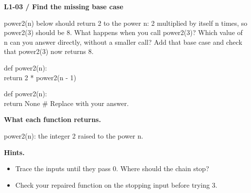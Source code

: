 \documentclass[11pt,a4paper]{article}
\begin{document}
\par\noindent\begin{minipage}{\linewidth}
\textbf{L1-03 / Find the missing base case}\par\smallskip power2(n) below should return 2 to the power n: 2 multiplied by itself n times, so power2(3) should be 8. What happens when you call power2(3)? Which value of n can you answer directly, without a smaller call? Add that base case and check that power2(3) now returns 8.\par
\par\smallskip\noindent\colorbox{codepaper}{\parbox{\dimexpr\linewidth-2\fboxsep\relax}{\small\ttfamily\raggedright def power2(n):\\\hspace*{2.4em}return 2 * power2(n - 1)}}\par
\par{}\par\smallskip\noindent\colorbox{codepaper}{\parbox{\dimexpr\linewidth-2\fboxsep\relax}{\small\ttfamily\raggedright def power2(n):\\\hspace*{2.4em}return None  \# Replace with your answer.}}\par
{\small\textbf{What each function returns.}\par power2(n): the integer 2 raised to the power n.\par }
{\small\textbf{Hints.}}\begin{itemize}\item Trace the inputs until they pass 0. Where should the chain stop?\item Check your repaired function on the stopping input before trying 3.\end{itemize}
\end{minipage}\par\vspace{2mm}
\end{document}
